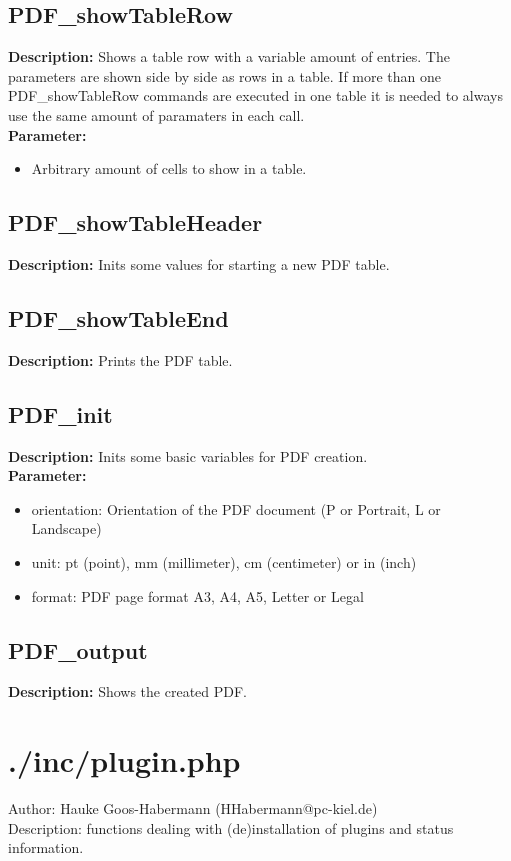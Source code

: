 \subsection{PDF\_showTableRow}
\textbf{Description:} Shows a table row with a variable amount of entries. The parameters are shown side by side as rows in a table. If more than one PDF\_showTableRow commands are executed in one table it is needed to always use the same amount of paramaters in each call.\\
\textbf{Parameter:}
\begin{itemize}
\item Arbitrary amount of cells to show in a table.
\end{itemize}

\subsection{PDF\_showTableHeader}
\textbf{Description:} Inits some values for starting a new PDF table.\\

\subsection{PDF\_showTableEnd}
\textbf{Description:} Prints the PDF table.\\

\subsection{PDF\_init}
\textbf{Description:} Inits some basic variables for PDF creation.\\
\textbf{Parameter:}
\begin{itemize}
\item orientation: Orientation of the PDF document (P or Portrait, L or Landscape)
\item unit: pt (point), mm (millimeter), cm (centimeter) or in (inch)
\item format: PDF page format A3, A4, A5, Letter or Legal
\end{itemize}

\subsection{PDF\_output}
\textbf{Description:} Shows the created PDF.\\

\newpage\section{./inc/plugin.php}
 Author: Hauke Goos-Habermann (HHabermann@pc-kiel.de)\\
 Description: functions dealing with (de)installation of plugins and status information.\\

